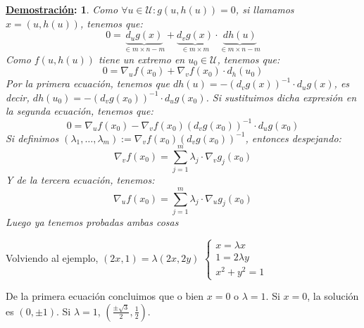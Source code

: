 \documentclass[10pt,a4paper,openright]{book}
\theoremstyle{break}
\newtheorem*{demo}{\underline{Demostración}:}
\begin{document}
\begin{demo}
Como $\forall u \in \mathcal{U}: g(u, h(u)) = 0$, si llamamos $x = (u, h(u))$, tenemos que:
\begin{equation}
0 = \underbrace{d_u g(x)}_{\in m \times n - m} + \underbrace{d_v g(x)}_{\in m \times m} \cdot \underbrace{dh(u)}_{\in m \times n - m}
\end{equation}
Como $f(u, h(u))$ tiene un extremo en $u_0 \in \mathcal{U}$, tenemos que:
\begin{equation}
0 = \nabla_u f(x_0) + \nabla_v f(x_0) \cdot d_h(u_0)
\end{equation}
Por la primera ecuación, tenemos que $dh(u) = - (d_v g(x))^{-1} \cdot d_u g(x)$, es decir, $dh(u_0) = - (d_v g(x_0))^{-1} \cdot d_u g(x_0)$. Si sustituimos dicha expresión en la segunda ecuación, tenemos que:
\begin{equation}
0 = \nabla_u f(x_0) - \nabla_v f(x_0) \left( d_v g(x_0) \right)^{-1} \cdot d_u g(x_0)
\end{equation}
Si definimos $(\lambda_1, \ldots, \lambda_m) := \nabla_v f(x_0) \left( d_v g(x_0) \right)^{-1}$, entonces despejando:
$$\nabla_v f(x_0) = \sum_{j = 1}^{m} \lambda_j \cdot \nabla_v g_j (x_0)$$
Y de la tercera ecuación, tenemos:
$$\nabla_u f(x_0) = \sum_{j = 1}^{m} \lambda_j \cdot \nabla_u g_j (x_0)$$
Luego ya tenemos probadas ambas cosas
\end{demo}


Volviendo al ejemplo, $(2x,1) = \lambda (2x, 2y)$
$\begin{cases} x = \lambda x \\ 1 = 2\lambda y \\ x^2 + y^2 = 1\end{cases}$

De la primera ecuación concluimos que o bien $x = 0$ o $\lambda = 1$. Si $x = 0$, la solución es $(0, \pm 1)$. Si $\lambda = 1$, $(\frac{\pm \sqrt{3}}{2}, \frac{1}{2})$. 
\end{document}
